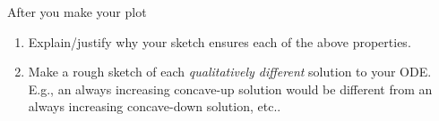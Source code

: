 \begin{enumerate}
    After you make your plot
    \begin{enumerate}
        \item Explain/justify why your sketch ensures each of the above properties.
        \item Make a rough sketch of each \emph{qualitatively different} 
        solution to your ODE. E.g., an always increasing concave-up solution would be different from an always increasing concave-down solution, etc..
    \end{enumerate}
\end{enumerate}
